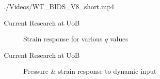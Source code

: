 \documentclass[aspectratio=169]{beamer}            %
\begin{document}
\begin{frame}[plain]

  \centering
    {./Videos/WT_BIDS_V8_short.mp4}
	
\end{frame}

\begin{frame}{Current Research at UoB}

  \begin{figure}[!htb]
    \centering
		
		\caption{Strain response for various ${q}$ values}
		\label{fig:StrainResponse2q}
  \end{figure}

\end{frame}

\begin{frame}{Current Research at UoB}

  \begin{figure}[!htb]
    \centering
		
		\caption{Pressure \& strain response to dynamic input}
		\label{fig:DistSens_DynResponse}
  \end{figure}

\end{frame}
\end{document}
